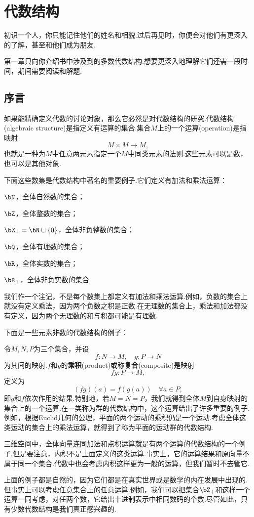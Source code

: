 ﻿\chapter{代数结构}
初识一个人，你只能记住他们的姓名和相貌.过后再见时，你便会对他们有更深入的了解，甚至和他们成为朋友.

第一章只向你介绍书中涉及到的多数代数结构.想要更深入地理解它们还需一段时间，期间需要阅读和解题.
\section{序言}
如果能精确定义代数的讨论对象，那么它必然是对代数结构的研究.代数结构(algebraic structure)是指定义有运算的集合.集合$M$上的一个运算(operation)是指映射
\[M\times M\to M,\]
也就是一种为$M$中任意两元素指定一个$M$中同类元素的法则.这些元素可以是数，也可以是其他对象.

下面这些数集是代数结构中著名的重要例子.它们定义有加法和乘法运算：

$\bN$，全体自然数的集合；

$\bZ$，全体整数的集合；

$\bZ_+=\bN\cup\{0\}$，全体非负整数的集合；

$\bQ$，全体有理数的集合；

$\bR$，全体实数的集合；

$\bR_+$，全体非负实数的集合.

我们作一个注记，不是每个数集上都定义有加法和乘法运算.例如，负数的集合上就没有定义乘法，因为两个负数之积是正数.在无理数的集合上，乘法和加法都没有定义，因为两个无理数的和与积都可能是有理数.

下面是一些元素非数的代数结构的例子：
\begin{example}
令$M,N,P$为三个集合，并设
\[f:N\to M,\quad g:P\to N\]
为其间的映射.$f$和$g$的\textbf{乘积}(product)或称\textbf{复合}(composite)是映射
\[fg:P\to M,\]
定义为
\[(fg)(a)=f(g(a))\quad\forall a\in P,\]
即$g$和$f$依次作用的结果.特别地，若$M=N=P$，我们就得到全体$M$到自身映射的集合上的一个运算.在一类称为群的代数结构中，这个运算给出了许多重要的例子.例如，根据Euclid几何的公理，平面的两个运动的乘积仍是一个运动.考虑全体这类运动的集合上的乘法运算，就得到了称为平面的运动群的代数结构.
\end{example}
\begin{example}
三维空间中，全体向量连同加法和点积运算就是有两个运算的代数结构的一个例子.但是要注意，内积不是上面定义的这类运算.事实上，它的运算结果和原向量不属于同一个集合.代数中也会考虑内积这样更为一般的运算，但我们暂时不去管它.
\end{example}
上面的例子都是自然的，因为它们都是在真实世界或是数学的内在发展中出现的.但事实上可以考虑任意集合上的任意运算.例如，我们可以把集合$\bZ_+$和这样一个运算一同考虑，对任两个数，它给出十进制表示中相同数码的个数.尽管如此，只有少数代数结构是我们真正感兴趣的.


